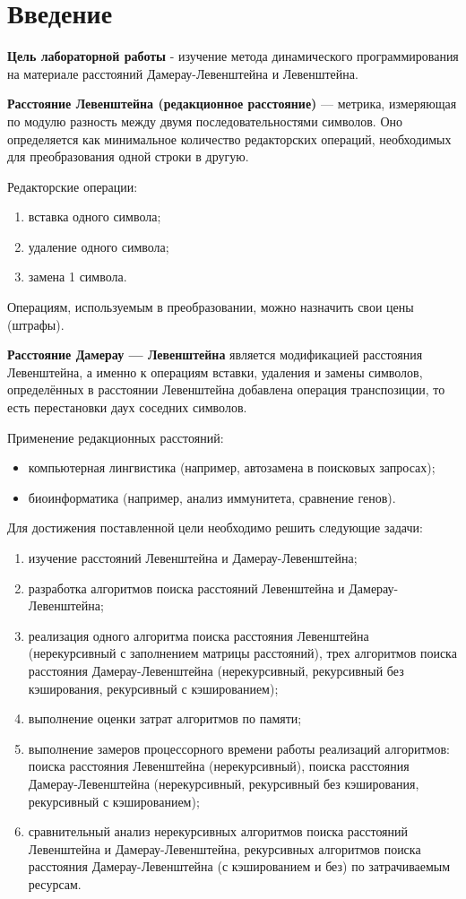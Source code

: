 \chapter*{Введение}
\textbf{Цель лабораторной работы} - изучение метода динамического программирования на материале расстояний Дамерау-Левенштейна и Левенштейна.

\textbf{Расстояние Левенштейна (редакционное расстояние)} — метрика, измеряющая по модулю разность между двумя последовательностями символов. Оно определяется как минимальное количество редакторских операций, необходимых для преобразования одной строки в другую.

Редакторские операции:
\begin{enumerate}[label={\arabic*)}]
    \item вставка одного символа;
    \item удаление одного символа;
    \item замена 1 символа.
\end{enumerate}

Операциям, используемым в преобразовании, можно назначить свои цены (штрафы).

\textbf{Расстояние Дамерау — Левенштейна} является модификацией расстояния Левенштейна, а именно к операциям вставки, удаления и замены символов, определённых в расстоянии Левенштейна добавлена операция транспозиции, то есть перестановки даух соседних символов.

Применение редакционных расстояний:
\begin{itemize}
	\item компьютерная лингвистика (например, автозамена в поисковых запросах);
	\item биоинформатика (например, анализ иммунитета, сравнение генов).
\end{itemize}

Для достижения поставленной цели необходимо решить следующие задачи:
\begin{enumerate}[label={\arabic*)}]
	\item изучение расстояний Левенштейна и Дамерау-Левенштейна;
	\item разработка алгоритмов поиска расстояний Левенштейна и Дамерау-Левенштейна;
	\item реализация одного алгоритма поиска расстояния Левенштейна (нерекурсивный с заполнением матрицы расстояний), трех алгоритмов поиска расстояния Дамерау-Левенштейна (нерекурсивный, рекурсивный без кэширования, рекурсивный с кэшированием);
	\item выполнение оценки затрат алгоритмов по памяти;
	\item выполнение замеров процессорного времени работы реализаций алгоритмов:  поиска расстояния Левенштейна (нерекурсивный), поиска расстояния Дамерау-Левенштейна (нерекурсивный, рекурсивный без кэширования, рекурсивный с кэшированием);
	\item сравнительный анализ нерекурсивных алгоритмов поиска расстояний Левенштейна и Дамерау-Левенштейна, рекурсивных алгоритмов поиска расстояния Дамерау-Левенштейна (с кэшированием и без) по затрачиваемым ресурсам.
\end{enumerate}
